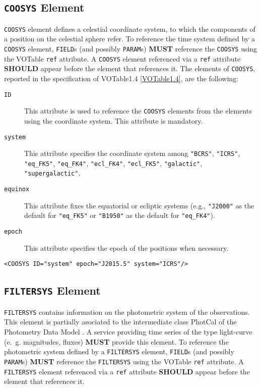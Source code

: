 \documentclass[11pt,a4paper]{ivoa}
\let\fg=\color
\def\attr#1{{\tt{\fg{DarkRed}#1}}}
\def\elem#1{{\tt{\fg{DarkRed}#1}}}
\begin{document}
\subsection{\elem{COOSYS} Element}
\elem{COOSYS} element defines a celestial coordinate system, to which the components of a position on the celestial sphere refer.
To reference the time system defined by a \elem{COOSYS} element, \elem{FIELD}s (and possibly \elem{PARAM}s) \textbf{MUST} reference the \elem{COOSYS} using the VOTable \attr{ref} attribute. A \elem{COOSYS} element referenced via a \attr{ref} attribute \textbf{SHOULD} appear before the element that references it. The elements of \elem{COOSYS}, reported in the specification of VOTable1.4 \ref{VOTable1.4}, are the following:
\begin{description}
     \item[\attr{ID}] This attribute is used to reference the \elem{COOSYS} elements from the elements using the coordinate system. This attribute is mandatory.
     \item[\attr{system}] This attribute specifies the coordinate system among \verb|"BCRS"|, \verb|"ICRS"|, \verb|"eq_FK5"|, \verb|"eq_FK4"|, \verb|"ecl_FK4"|, \verb|"ecl_FK5"|, \verb|"galactic"|, \verb|"supergalactic"|. 
     \item[\attr{equinox}] This attribute fixes the equatorial or ecliptic systems (e.g., \verb|"J2000"| as the default for \verb|"eq_FK5"| or \verb|"B1950"| as the default for \verb|"eq_FK4"|).
     \item[\attr{epoch}] This attribute specifies the epoch of the positions when necessary.%
\end{description}

\noindent
\begingroup\footnotesize
\begin{tcolorbox}
\begin{verbatim}
<COOSYS ID="system" epoch="J2015.5" system="ICRS"/>
\end{verbatim}
\end{tcolorbox}
\endgroup

\subsection{\elem{FILTERSYS} Element}
\elem{FILTERSYS} contains information on the photometric system of the observations. This element is partially asociated to the intermediate class PhotCal of the Photometry Data Model \cite{PhotometryDM}. A service providing time series of the type light-curve (e.~g. magnitudes, fluxes) \textbf{MUST} provide this element. To reference the photometric system defined by a \elem{FILTERSYS} element, \elem{FIELD}s (and possibly \elem{PARAM}s) \textbf{MUST} reference the \elem{FILTERSYS} using the VOTable \attr{ref} attribute. A \elem{FILTERSYS} element referenced via a \attr{ref} attribute \textbf{SHOULD} appear before the element that references it. 
\end{document}

